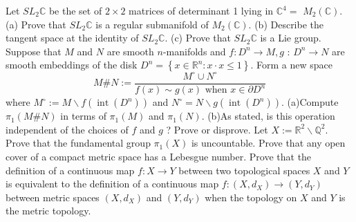 \documentclass[10pt]{article}
\begin{document}
Let $S L_{2} \mathbb{C}$ be the set of $2 \times 2$ matrices of determinant 1 lying in $\mathbb{C}^{4}=$ $M_{2}(\mathbb{C})$.
(a) Prove that $S L_{2} \mathbb{C}$ is a regular submanifold of $M_{2}(\mathbb{C})$.
(b) Describe the tangent space at the identity of $S L_{2} \mathbb{C}$.
(c) Prove that $S L_{2} \mathbb{C}$ is a Lie group.
\newpage
Suppose that $M$ and $N$ are smooth $n$-manifolds and $f: D^{n} \rightarrow M, g$ : $D^{n} \rightarrow N$ are smooth embeddings of the disk $D^{n}=\left\{x \in \mathbb{R}^{n}: x \cdot x \leq 1\right\}$. Form a new space
$$
M \# N:=\frac{M^{\circ} \cup N^{\circ}}{f(x) \sim g(x) \text { when } x \in \partial D^{n}}
$$
where $M^{\circ}:=M \backslash f\left(\operatorname{int}\left(D^{n}\right)\right)$ and $N^{\circ}=N \backslash g\left(\operatorname{int}\left(D^{n}\right)\right)$.
(a)Compute $\pi_{1}(M \# N)$ in terms of $\pi_{1}(M)$ and $\pi_{1}(N)$.
(b)As stated, is this operation independent of the choices of $f$ and $g$ ? Prove or disprove.
\newpage
Let $X:=\mathbb{R}^{2} \backslash \mathbb{Q}^{2}$. Prove that the fundamental group $\pi_{1}(X)$ is uncountable.
\newpage
Prove that any open cover of a compact metric space has a Lebesgue number.
\newpage
Prove that the definition of a continuous map $f: X \rightarrow Y$ between two topological spaces $X$ and $Y$ is equivalent to the definition of a continuous map $f:\left(X, d_{X}\right) \rightarrow\left(Y, d_{Y}\right)$ between metric spaces $\left(X, d_{X}\right)$ and $\left(Y, d_{Y}\right)$ when the topology on $X$ and $Y$ is the metric topology.
\end{document}
